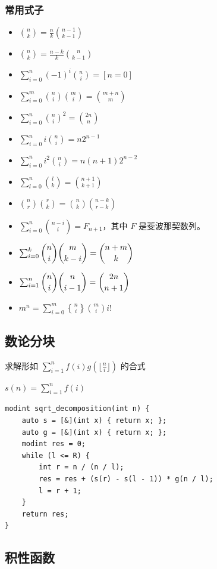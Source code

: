 \documentclass[UTF8, twoside]{ctexart}
\begin{document}
\begin{sloppypar}
\subsubsection{常用式子}

\begin{itemize}
   \item $\binom{n}{k} = \frac{n}{k} \binom{n-1}{k-1}$
   \item $\binom{n}{k} = \frac{n-k}{k} \binom{n}{k-1}$
   \item $\sum_{i=0}^n(-1)^i\binom{n}{i}=[n=0]$
   \item $\sum_{i=0}^m \binom{n}{i}\binom{m}{i} = \binom{m+n}{m}$
   \item $\sum_{i=0}^n\binom{n}{i}^2=\binom{2n}{n}$
   \item $\sum_{i=0}^ni\binom{n}{i}=n2^{n-1}$
   \item $\sum_{i=0}^ni^2\binom{n}{i}=n(n+1)2^{n-2}$
   \item $\sum_{l=0}^n\binom{l}{k} = \binom{n+1}{k+1}$
   \item $\binom{n}{r}\binom{r}{k} = \binom{n}{k}\binom{n-k}{r-k}$
   \item $\sum_{i=0}^n\binom{n-i}{i}=F_{n+1}$，其中 $F$ 是斐波那契数列。
   \item $\sum_{i=0}^k\dbinom{n}{i}\dbinom{m}{k-i}=\dbinom{n+m}{k}$
   \item $\sum_{i=1}^{n}\dbinom{n}{i}\dbinom{n}{i-1}=\dbinom{2n}{n+1}$
   \item $m^n = \sum_{i=0}^{m}{n \brace i}\binom{m}{i}i!$
\end{itemize}

\subsection{数论分块}

求解形如 $\sum_{i=1}^{n}f(i)g(\lfloor\frac{n}{i}\rfloor)$ 的合式

$s(n) = \sum_{i=1}^{n}f(i)$

\begin{lstlisting}[style=cpp]
modint sqrt_decomposition(int n) {
    auto s = [&](int x) { return x; };
    auto g = [&](int x) { return x; };
    modint res = 0;
    while (l <= R) {
        int r = n / (n / l);
        res = res + (s(r) - s(l - 1)) * g(n / l);
        l = r + 1;
    }
    return res;
}
\end{lstlisting}

\subsection{积性函数}


\end{sloppypar}
\end{document}

